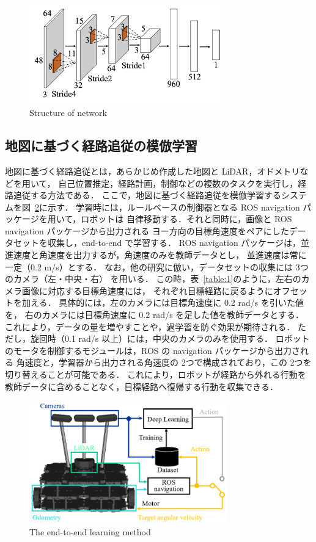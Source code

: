 \documentclass{jarticle}
\renewcommand{\figurename}{図~}
\renewcommand{\tablename}{表~}
\newcommand{\figref}[1]{\figurename\ref{#1}}
\newcommand{\tabref}[1]{\tablename\ref{#1}}
\begin{document}
\begin{figure}[h!]
  \centering
   \includegraphics[height=43mm]{pdf/network.pdf}
   \caption{Structure of network}
   \label{fig:2}
\end{figure}


\subsection{地図に基づく経路追従の模倣学習}
地図に基づく経路追従とは，あらかじめ作成した地図と LiDAR，オドメトリなどを用いて，
自己位置推定，経路計画，制御などの複数のタスクを実行し，経路追従する方法である．
ここで，地図に基づく経路追従を模倣学習するシステムを\figref{fig:3}に示す．
学習時には，ルールベースの制御器となる ROS navigation パッケージ\cite{navigation}を用いて，ロボットは
自律移動する．それと同時に，画像と ROS navigation パッケージから出力される
ヨー方向の目標角速度をペアにしたデータセットを収集し，end-to-end で学習する．
ROS navigation パッケージは，並進速度と角速度を出力するが，角速度のみを教師データとし，
並進速度は常に一定（0.2 m/s）とする．
なお，他の研究\cite{Moridian}\cite{Bojarski}に倣い，データセットの収集には 3つのカメラ（左・中央・右）
を用いる．
この時，\tabref{table:1}のように，左右のカメラ画像に対応する目標角速度には，
それぞれ目標経路に戻るようにオフセットを加える．
具体的には，左のカメラには目標角速度に 0.2 rad/s を引いた値を，
右のカメラには目標角速度に 0.2 rad/s を足した値を教師データとする．
これにより，データの量を増やすことや，過学習を防ぐ効果が期待される．
ただし，旋回時（0.1 rad/s 以上）には，中央のカメラのみを使用する．
ロボットのモータを制御するモジュールは，ROS の navigation パッケージから出力される
角速度と，学習器から出力される角速度の 2つで構成されており，この 2つを切り替えることが可能である．
これにより，ロボットが経路から外れる行動を教師データに含めることなく，目標経路へ復帰する行動を収集できる．

\begin{figure}[h!]
  \centering
   \includegraphics[height=53mm]{./png/learn.png}
   \caption{The end-to-end learning method}
   \label{fig:3}
\end{figure}
\end{document}
